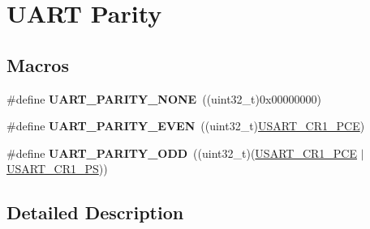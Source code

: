 \hypertarget{group___u_a_r_t___parity}{\section{U\-A\-R\-T Parity}
\label{group___u_a_r_t___parity}
}
\subsection*{Macros}
\begin{DoxyCompactItemize}
\item 
\hypertarget{group___u_a_r_t___parity_ga270dea6e1a92dd83fe58802450bdd60c}{\#define {\bfseries U\-A\-R\-T\-\_\-\-P\-A\-R\-I\-T\-Y\-\_\-\-N\-O\-N\-E}~((uint32\-\_\-t)0x00000000)}\label{group___u_a_r_t___parity_ga270dea6e1a92dd83fe58802450bdd60c}

\item 
\hypertarget{group___u_a_r_t___parity_ga063b14ac42ef9e8f4246c17a586b14eb}{\#define {\bfseries U\-A\-R\-T\-\_\-\-P\-A\-R\-I\-T\-Y\-\_\-\-E\-V\-E\-N}~((uint32\-\_\-t)\hyperlink{group___peripheral___registers___bits___definition_ga60f8fcf084f9a8514efafb617c70b074}{U\-S\-A\-R\-T\-\_\-\-C\-R1\-\_\-\-P\-C\-E})}\label{group___u_a_r_t___parity_ga063b14ac42ef9e8f4246c17a586b14eb}

\item 
\hypertarget{group___u_a_r_t___parity_ga229615e64964f68f7a856ea6ffea359e}{\#define {\bfseries U\-A\-R\-T\-\_\-\-P\-A\-R\-I\-T\-Y\-\_\-\-O\-D\-D}~((uint32\-\_\-t)(\hyperlink{group___peripheral___registers___bits___definition_ga60f8fcf084f9a8514efafb617c70b074}{U\-S\-A\-R\-T\-\_\-\-C\-R1\-\_\-\-P\-C\-E} $\vert$ \hyperlink{group___peripheral___registers___bits___definition_ga2e159d36ab2c93a2c1942df60e9eebbe}{U\-S\-A\-R\-T\-\_\-\-C\-R1\-\_\-\-P\-S}))}\label{group___u_a_r_t___parity_ga229615e64964f68f7a856ea6ffea359e}

\end{DoxyCompactItemize}


\subsection{Detailed Description}
